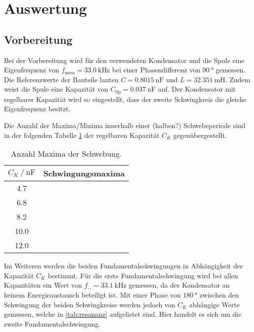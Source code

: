\section{Auswertung}
\label{sec:Auswertung}

\subsection{Vorbereitung}
Bei der Vorbereitung wird für den verwendeten Kondensator und die Spule eine Eigenfrequenz von 
$f_{\text{mess}}=\SI{33.0}{\kilo\hertz}$ bei einer Phasendifferenz von $\SI{90}{\degree}$ gemessen. 
Die Referenzwerte der Bauteile lauten $C=\SI{0.8015}{\nano\farad}$ und $L=\SI{32.351}{\milli\henry}$. 
Zudem weist die Spule eine Kapazität von $C_\text{Sp}=\SI{0.037}{\nano\farad}$ auf.
Der Kondensator mit regelbarer Kapazität wird so eingestellt, dass der zweite Schwingkreis die gleiche Eigenfrequenz besitzt.

Die Anzahl der Maxima/Minima innerhalb einer (halben?) Schwebeperiode sind in der folgenden Tabelle \ref{tab:schwing_maxima} der regelbaren Kapazität $C_K$ gegenübergestellt.

\begin{table}
    \centering
    \caption{Anzahl Maxima der Schwebung.}
    \label{tab:schwing_maxima}
    \begin{tabular}{c c}
        \toprule
        {$C_K \:/\: \si{\nano\farad}$} & Schwingungsmaxima \\
        \midrule
        4.7  & \\ 
        6.8  & \\ 
        8.2  & \\ 
        10.0 & \\ 
        12.0 & \\ 
        \bottomrule
    \end{tabular}
\end{table}

Im Weiteren werden die beiden Fundamentalschwingungen in Abhängigkeit der Kapazität $C_K$ bestimmt.
Für die erste Fundamentalschwingung wird bei allen Kapazitäten ein Wert von $f_- = \SI{33.1}{\kilo\hertz}$ gemessen, da der Kondensator an keinem Energieaustausch beteiligt ist.
Mit einer Phase von $\SI{180}{\degree}$ zwischen den Schwingung der beiden Schwingkreise werden jedoch von $C_K$ abhängige Werte gemessen, welche in \ref{tab:resonanz} aufgelistet sind.
Hier handelt es sich um die zweite Fundamentalschwingung.

